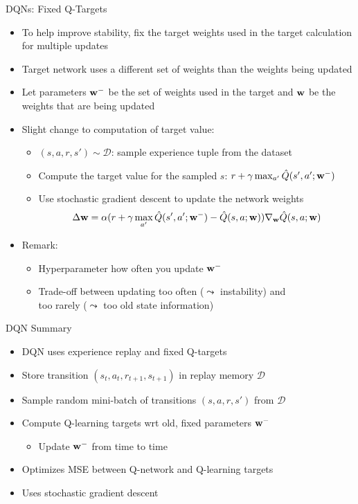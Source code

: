 \documentclass[aspectratio=169]{../latex_main/tntbeamer}  %
\begin{document}
\begin{frame}[c]{DQNs: Fixed Q-Targets}
	
	\begin{itemize}
		\item To help improve stability, fix the \alert{target weights} used in the target calculation for multiple updates
		\item Target network uses a different set of weights than the weights being updated
		\item Let parameters $\mathbf{w}^-$ be the set of weights used in the target and $\mathbf{w}$ be the weights that are being updated
		\item Slight change to computation of target value:
		\begin{itemize}
			\item $(s,a,r,s')\sim \mathcal{D}$: sample experience tuple from the dataset
			\item Compute the target value for the sampled $s$: $r+\gamma \max_{a'} \hat{Q}(s',a';\mathbf{w}^-)$
			\item Use stochastic gradient descent to update the network weights
			$$\Delta \mathbf{w} = \alpha (r + \gamma \max_{a'} \hat{Q}(s',a';\mathbf{w}^-) - \hat{Q}(s,a;\mathbf{w})) \nabla_{\mathbf{w}}\hat{Q}(s,a;\mathbf{w})$$
		\end{itemize}
		\smallskip 
		\pause
		\item Remark:
		\begin{itemize}
			\item Hyperparameter how often you update $\mathbf{w}^-$
			\item Trade-off between updating too often ($\leadsto$ instability) and\\ too rarely ($\leadsto$ too old state information)
		\end{itemize}
	\end{itemize}
	
\end{frame}
\begin{frame}[c]{DQN Summary}
	
	\begin{itemize}
		\item DQN uses experience replay and fixed Q-targets
		\item Store transition $(s_t, a_t, r_{t+1}, s_{t+1})$ in replay memory $\mathcal{D}$
		\item Sample random mini-batch of transitions $(s,a,r,s')$ from $\mathcal{D}$
		\item Compute Q-learning targets wrt old, fixed parameters $\mathbf{w}^-$
		\begin{itemize}
			\item Update $\mathbf{w}^-$ from time to time
		\end{itemize}
		\item Optimizes MSE between Q-network and Q-learning targets
		\item Uses stochastic gradient descent
	\end{itemize}
	
\end{frame}
\end{document}
